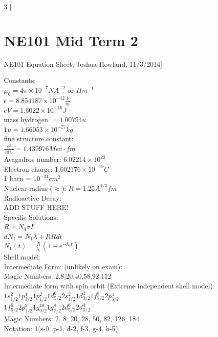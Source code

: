 \documentclass{article}
\begin{document}
\begin{multicols}{3}
[
\section{NE101 Mid Term 2}
NE101 Equation Sheet, Joshua Howland, 11/3/2014]

Constants:\\
$\mu_{0} = 4 \pi \times 10 ^{-7} NA^{-2}$ or $Hm^{-1} $\\
$\epsilon = 8.854187 \times 10 ^{-12} \frac{F}{m}$\\	
$eV = 1.6022\times 10 ^{-16} J$\\
mass hydrogen $ = 1.00794u  $\\
$1u = 1.66053 \times 10^{-27} kg $\\
fine structure constant: \\
$\frac{e^{2}}{4\pi\epsilon_{0}} = 1.439976 Mev \cdot fm$\\
Avagadros number: $6.02214\times 10^{23}$\\
Electron charge: $1.602176\times 10^{-19} C$\\
1 barn = $10^{-24} cm^{2}$\\

Nuclear radius ($\approx$): $ R = 1.25A^{1/3} fm$\\

Radioactive Decay:\\
ADD STUFF HERE!\\
Specific Solutions:\\
$R = N_{0}\sigma I$\\
$dN_{1} = N_{1}\lambda + RRdt$\\
$N_{1}(t) = \frac{R}{\lambda_{1}}(1 - e^{-\lambda_{1}t})$\\


Shell model:\\
Intermediate Form: (unlikely on exam):\\
Magic Numbers: 2,8,20,40,58,92,112 \\

Intermediate form with spin orbit (Extreme independent shell model):\\
$1s_{1/2}^{2} 1p_{3/2}^{4} 1p_{1/2}^{2} 1d_{5/2}^{6} 2s_{1/2}^{2} 1d_{3/2}^{4} 1f_{7/2}^{8} 2p_{3/2}^{4} $\\
$1f_{5/2}^{6} 2p_{1/2}^{2} 1g_{9/2}^{10} 1g_{7/2}^{8} 2d_{5/2}^{6} 2d_{3/2}^{4}$\\
Magic Numbers: 2, 8, 20, 28, 50, 82, 126, 184\\
Notation: 1(s-0, p-1, d-2, f-3, g-4, h-5)\\


\end{multicols}
\end{document}
